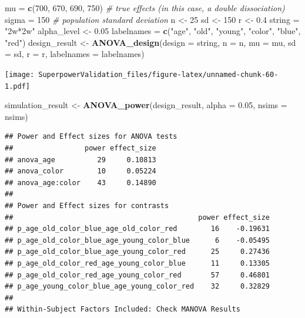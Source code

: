 \documentclass[]{book}
\newenvironment{Shaded}{\begin{snugshade}}{\end{snugshade}}
\newcommand{\CommentTok}[1]{\textcolor[rgb]{0.56,0.35,0.01}{\textit{#1}}}
\newcommand{\DataTypeTok}[1]{\textcolor[rgb]{0.13,0.29,0.53}{#1}}
\newcommand{\DecValTok}[1]{\textcolor[rgb]{0.00,0.00,0.81}{#1}}
\newcommand{\FloatTok}[1]{\textcolor[rgb]{0.00,0.00,0.81}{#1}}
\newcommand{\KeywordTok}[1]{\textcolor[rgb]{0.13,0.29,0.53}{\textbf{#1}}}
\newcommand{\NormalTok}[1]{#1}
\newcommand{\StringTok}[1]{\textcolor[rgb]{0.31,0.60,0.02}{#1}}
\begin{document}
\begin{Shaded}
\begin{Highlighting}[]
\NormalTok{mu =}\StringTok{ }\KeywordTok{c}\NormalTok{(}\DecValTok{700}\NormalTok{, }\DecValTok{670}\NormalTok{, }\DecValTok{690}\NormalTok{, }\DecValTok{750}\NormalTok{) }\CommentTok{# true effects (in this case, a double dissociation)}
\NormalTok{sigma =}\StringTok{ }\DecValTok{150}  \CommentTok{# population standard deviation}
\NormalTok{n <-}\StringTok{ }\DecValTok{25}
\NormalTok{sd <-}\StringTok{ }\DecValTok{150}
\NormalTok{r <-}\StringTok{ }\FloatTok{0.4}
\NormalTok{string =}\StringTok{ "2w*2w"}
\NormalTok{alpha_level <-}\StringTok{ }\FloatTok{0.05}
\NormalTok{labelnames =}\StringTok{ }\KeywordTok{c}\NormalTok{(}\StringTok{"age"}\NormalTok{, }\StringTok{"old"}\NormalTok{, }\StringTok{"young"}\NormalTok{, }\StringTok{"color"}\NormalTok{, }\StringTok{"blue"}\NormalTok{, }\StringTok{"red"}\NormalTok{)}
\NormalTok{design_result <-}\StringTok{ }\KeywordTok{ANOVA_design}\NormalTok{(}\DataTypeTok{design =}\NormalTok{ string,}
                              \DataTypeTok{n =}\NormalTok{ n, }
                              \DataTypeTok{mu =}\NormalTok{ mu, }
                              \DataTypeTok{sd =}\NormalTok{ sd, }
                              \DataTypeTok{r =}\NormalTok{ r, }
                              \DataTypeTok{labelnames =}\NormalTok{ labelnames)}
\end{Highlighting}
\end{Shaded}

\texttt{[image: SuperpowerValidation\_files/figure-latex/unnamed-chunk-60-1.pdf]}

\begin{Shaded}
\begin{Highlighting}[]
\NormalTok{simulation_result <-}\StringTok{ }\KeywordTok{ANOVA_power}\NormalTok{(design_result, }\DataTypeTok{alpha =} \FloatTok{0.05}\NormalTok{, }\DataTypeTok{nsims =}\NormalTok{ nsims)}
\end{Highlighting}
\end{Shaded}

\begin{verbatim}
## Power and Effect sizes for ANOVA tests
##                 power effect_size
## anova_age          29     0.10813
## anova_color        10     0.05224
## anova_age:color    43     0.14890
## 
## Power and Effect sizes for contrasts
##                                            power effect_size
## p_age_old_color_blue_age_old_color_red        16    -0.19631
## p_age_old_color_blue_age_young_color_blue      6    -0.05495
## p_age_old_color_blue_age_young_color_red      25     0.27436
## p_age_old_color_red_age_young_color_blue      11     0.13305
## p_age_old_color_red_age_young_color_red       57     0.46801
## p_age_young_color_blue_age_young_color_red    32     0.32829
## 
## Within-Subject Factors Included: Check MANOVA Results
\end{verbatim}
\end{document}
